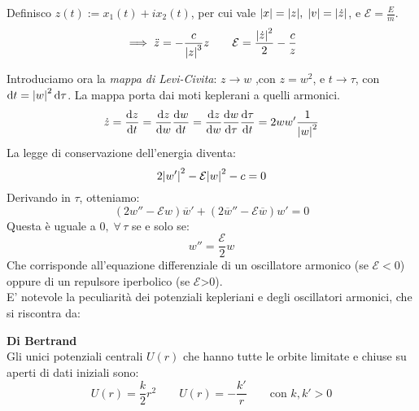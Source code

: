 Definisco $z(t):=x_1(t)+ix_2(t)$, per cui vale $\abs{x}= \abs{z}, \;\abs{v}= \abs{\dot{z}}$, e $\mathcal{E}=\frac{E}{m}$.
\begin{equation}
    \implies \ddot{z}= -\frac{c}{\abs{z}^3}z \qquad \mathcal{E}= \frac{\abs{\dot{z}}^2}{2}-\frac{c}{z}
\end{equation}

Introduciamo ora la \textit{mappa di Levi-Civita}: $z\rightarrow w$ ,con $z = w^2$, e $t\rightarrow \tau$, con $\dd{t}= \abs{w}^2\dd{\tau}$.
La mappa porta dai moti keplerani a quelli armonici.
\begin{equation}
    \dot{z}= \dv{z}{t}= \dv{z}{w}\dv{w}{t}= \dv{z}{w}\dv{w}{\tau}\dv{\tau}{t}= 2 w w' \frac{1}{\abs{w}^2}
\end{equation}
La legge di conservazione dell'energia diventa:
\begin{equation}
    2\abs{w'}^2-\mathcal{E}\abs{w}^2-c=0
\end{equation}
Derivando in $\tau$, otteniamo:
\begin{equation}
    \left( 2w'' - \mathcal{E}w \right)\overline{w}' + \left( 2\overline{w}'' - \mathcal{E}\overline{w} \right)w' = 0
\end{equation}
Questa è uguale a $0, \;\forall\,\tau$ se e solo se:
\begin{equation}
    w''=\frac{\mathcal{E}}{2}w
\end{equation}
Che corrisponde all'equazione differenziale di un oscillatore armonico (se $\mathcal{E}<0$) oppure di un repulsore iperbolico (se $\mathcal{E}$>0).\\
E' notevole la peculiarità dei potenziali kepleriani e degli oscillatori armonici, che si riscontra da:
\begin{theorem}
    \textbf{Di Bertrand}\\
    Gli unici potenziali centrali $U(r)$ che hanno tutte le orbite limitate e chiuse su aperti di dati iniziali sono:
    \begin{equation}
        U(r)= \frac{k}{2}r^2 \qquad U(r)= -\frac{k'}{r} \qquad \text{con } k,k'>0
    \end{equation}
\end{theorem}


